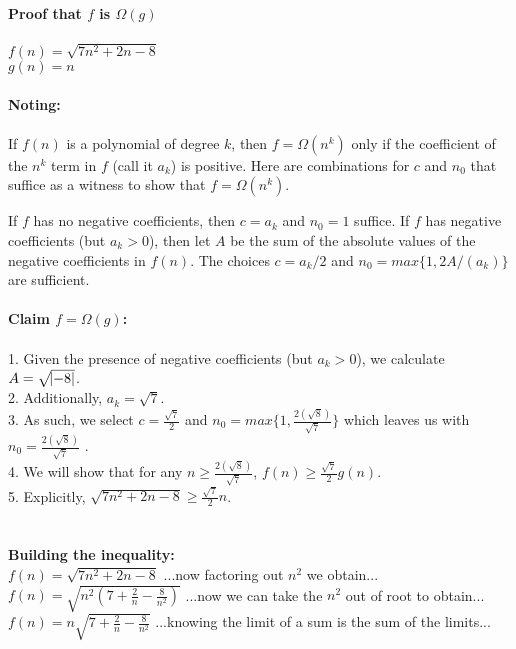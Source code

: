 \documentclass[OPONE]{example}
\begin{document}
\begin{list}{}{}
\textbf{Proof that $f$ is $\Omega(g)$} \\ 
\\
$f(n) = \sqrt{7n^{2} + 2n - 8} $ \\
$g(n) = n$ \\
\\
\textbf{Noting: }\\
\\
If $f(n)$ is a polynomial of degree $k$, then $f = \Omega(n^{k})$ only if the coefficient of the $n^{k}$ term in $f$ (call it $a_{k}$) is positive. Here are combinations for $c$ and $n_{0}$ that suffice as a witness to show that $f = \Omega(n^{k})$.

If $f$ has no negative coefficients, then $c = a_{k}$ and $n_{0} = 1$ suffice.
If $f$ has negative coefficients (but $a_{k} > 0$), then let $A$ be the sum of the absolute values of the negative coefficients in $f(n)$. The choices $c = a_{k}/2$ and $n_{0} = max\{1, 2A/(a_{k})\}$ are sufficient. \\
\\
\textbf{Claim $f = \Omega(g)$: }\\
\\
1. Given the presence of negative coefficients (but $a_{k} > 0$),  we calculate $A = \sqrt{\abs{-8}}$.\\
2. Additionally, $a_{k} = \sqrt{7}$. \\
3. As such, we select $c = \frac{\sqrt{7}}{2}$ and $n_{0} = max\{1, 
		\frac{
			2(\sqrt{8})
		}{
			\sqrt{7}
		}
\}$ which leaves us with $n_{0} = 
		\frac{
			2(\sqrt{8})
		}{
			\sqrt{7}
		}$
.  \\
4. We will show that for any $n \geq 
			\frac{
			2(\sqrt{8})
		}{
			\sqrt{7}
}$, $f(n) \geq \frac{\sqrt{7}}{2}g(n)$. \\
5. Explicitly, $ \sqrt{7n^{2} + 2n - 8}  \geq  \frac{\sqrt{7}}{2}n$.\\
\\
\\
\textbf{Building the inequality:} \\
$f(n) = \sqrt{7n^{2} + 2n - 8} $ \hspace{1.0 in} ...now factoring out $n^{2} $ we obtain...\\
$f(n) = \sqrt{n^{2}(7 + \frac{2}{n} - \frac{8}{n^{2}})} $ \hspace{.85 in} ...now we can take the $n^{2}$ out of root to obtain...\\
$f(n) = n\sqrt{7 + \frac{2}{n} - \frac{8}{n^{2}}} $ \hspace{1.05 in} ...knowing the limit of a sum is the sum of the limits...\\

\end{list}
\end{document}

